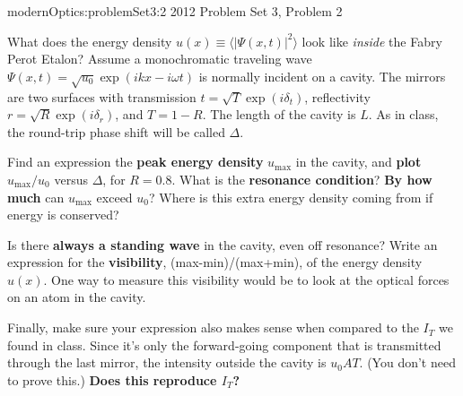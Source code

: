 {modernOptics:problemSet3:2}
{2012 Problem Set 3, Problem 2}
{
What does the energy density $u(x) \equiv \langle | \Psi(x,t) |^2 \rangle$ look like {\em inside} the Fabry Perot Etalon? Assume a monochromatic traveling wave $\Psi(x,t) = \sqrt{u_0} \exp{(i k x - i \omega t)}$ is normally incident on a cavity. The mirrors are two surfaces with transmission $t = \sqrt{T} \exp{(i \delta_t)}$, reflectivity $r = \sqrt{R} \exp{(i \delta_r)}$, and $T=1-R$. The length of the cavity is $L$. As in class, the round-trip phase shift will be called $\Delta$.


Find an expression the {\bf peak energy density} $u_{\mathrm{max}}$ in the cavity, and {\bf plot} $u_{\mathrm{max}}/ u_0$ versus $\Delta$, for $R=0.8$. What is the {\bf resonance condition}? {\bf By how much} can $u_{\mathrm{max}}$ exceed $u_0$? Where is this extra energy density coming from if energy is conserved?


Is there {\bf always a standing wave} in the cavity, even off resonance? Write an expression for the {\bf visibility}, (max-min)/(max+min), of the energy density $u(x)$. One way to measure this visibility would be to look at the optical forces on an atom in the cavity.


Finally, make sure your expression also makes sense when compared to the $I_T$ we found in class. Since it's only the forward-going component that is transmitted through the last mirror, the intensity outside the cavity is $u_0 A T$. (You don't need to prove this.) {\bf Does this reproduce $I_T$?}
} %

